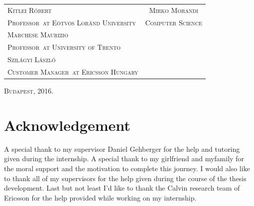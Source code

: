 \documentclass[a4paper,11pt]{report} %
\theoremstyle{change}
\theoremstyle{theoremstyle}
\def\myauthor{Mirko Morandi} %
\def\myacdsup{Kitlei Róbert} %
\def\myacdsuptit{Professor}%
\def\myacdsupen{Marchese Maurizio} %
\def\myacdsupentit{Professor}%
\def\myentryuni{University of Trento}%
\def\myindsup{Szilágyi László}%
\def\myindsuptit{Customer Manager}%
\def\myindcom{Ericsson Hungary}%
\def\currentyear{2016.}%
\begin{document}
\begin{titlepage}
\vspace{4cm}

\begin{tabular}{p{9cm}c}

{\fontsize{14}{10} \scshape \myacdsup} & {\fontsize{14}{10} \scshape \myauthor}\\

{\fontsize{10.5}{20} \scshape \myacdsuptit \ at Eötvös Loránd University }\quad & {\fontsize{10.5}{20} \scshape Computer Science}\\
{\fontsize{14}{20} \scshape \myacdsupen}&\\

{\fontsize{10.5}{20} \scshape \myacdsupentit \ at \myentryuni}&\\

{\fontsize{14}{20} \scshape \myindsup}&\\

{\fontsize{10.5}{20} \scshape \myindsuptit \ at \myindcom}&\\
\end{tabular}

\vspace{3cm}
\begin{center}
{\large \scshape Budapest, \currentyear \\}
\end{center}
\end{titlepage}





\chapter*{Acknowledgement}
A special thank to my supervisor Daniel Gehberger for
the help and tutoring given during the internship.
A special thank to my girlfriend and myfamily
for the moral support and the motivation to complete this journey. I would also like to thank all of my supervisors for the help given during the course
of the thesis development. Last but
not least I'd like to thank the Calvin research team of Ericsson for the help provided
while working on my internship.

\tableofcontents
\listoffigures
\listoftables
\newpage
\leavevmode\thispagestyle{empty}\newpage









%





\end{document}
